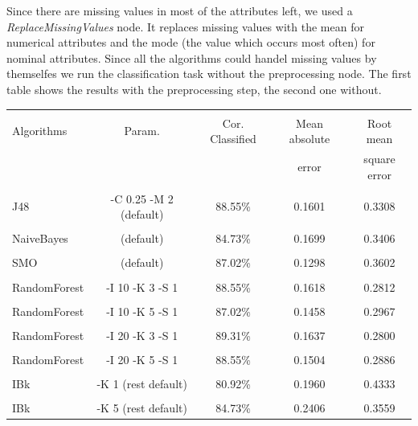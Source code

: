 \documentclass[a4paper]{article}
\begin{document}
Since there are missing values in most of the attributes left, we used a
\emph{ReplaceMissingValues} node. It replaces missing values with the mean for
numerical attributes and the mode (the value which occurs most often) for nominal
attributes. Since all the algorithms could handel missing values by themselfes
we run the classification task without the preprocessing node.
The first table shows the results with the preprocessing step, the second one
without.
\begin{table}
\begin{tabular}{|l| c | c | c | c |}
\hline & & & & \\
Algorithms & Param. & Cor. Classified & Mean absolute & Root mean \\
& & & error & square error\\
\hline & & & & \\
J48 &-C 0.25 -M 2 (default) & 88.55\% & 0.1601 & 0.3308 \\
\hline & & & & \\
NaiveBayes & (default) & 84.73\% & 0.1699 & 0.3406 \\
\hline & & & & \\
   SMO & (default) & 87.02\% & 0.1298 & 0.3602 \\
\hline & & & & \\
RandomForest & -I 10 -K 3 -S 1 & 88.55\% & 0.1618 & 0.2812 \\
\hline & & & & \\
RandomForest & -I 10 -K 5 -S 1 & 87.02\% & 0.1458 & 0.2967 \\
\hline & & & & \\
RandomForest & -I 20 -K 3 -S 1 & 89.31\% & 0.1637 & 0.2800 \\
\hline & & & & \\
RandomForest & -I 20 -K 5 -S 1 & 88.55\% & 0.1504 & 0.2886 \\
\hline & & & & \\
IBk          & -K 1 (rest default) & 80.92\% & 0.1960 & 0.4333 \\
\hline & & & & \\
IBk          & -K 5 (rest default) & 84.73\% & 0.2406 & 0.3559 \\
\hline 
\end{tabular}
\end{table}
\end{document}
